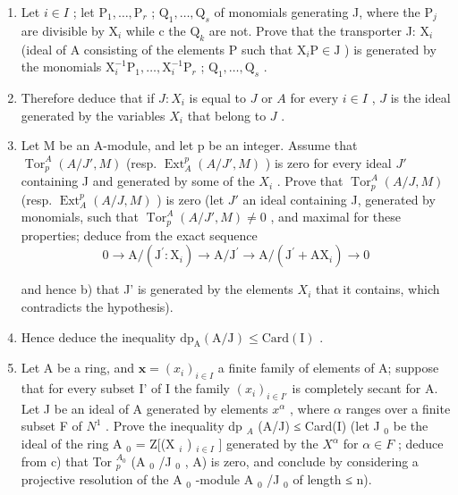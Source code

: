 \begin{enumerate}
\def\labelenumi{\alph{enumi})}
\item
  Let \(i \in I\) ; let \(\mathrm{P}_{1}, \ldots, \mathrm{P}_{r}\) ; \(\mathrm{Q}_{1}, \ldots, \mathrm{Q}_{s}\) of monomials generating J, where the \(\mathrm{P}_{j}\) are divisible by \(\mathrm{X}_{i}\) while c the \(\mathrm{Q}_{k}\) are not. Prove that the transporter J: \(\mathrm{X}_{i}\) (ideal of A consisting of the elements P such that \(\mathrm{X}_{i} \mathrm{P} \in \mathrm{J}\) ) is generated by the monomials \(\mathrm{X}_{i}^{-1} \mathrm{P}_{1}, \ldots, \mathrm{X}_{i}^{-1} \mathrm{P}_{r}\) ; \(\mathrm{Q}_{1}, \ldots, \mathrm{Q}_{s}\) .
\item
  Therefore deduce that if \(J: X_i\) is equal to \(J\) or \(A\) for every \(i \in I\) , \(J\) is the ideal generated by the variables \(X_i\) that belong to \(J\) .
\item
  Let M be an A-module, and let p be an integer. Assume that \(\operatorname{Tor}_{p}^{A}(A/J',M)\) (resp. \(\operatorname{Ext}_{A}^{p}(A/J',M)\) ) is zero for every ideal \(J'\) containing J and generated by some of the \(X_{i}\) . Prove that \(\operatorname{Tor}_{p}^{A}(A/J,M)\) (resp. \(\operatorname{Ext}_{A}^{p}(A/J,M)\) ) is zero (let \(J'\) an ideal containing J, generated by monomials, such that \(\operatorname{Tor}_{p}^{A}(A/J',M) \neq 0\) , and maximal for these properties; deduce from the exact sequence
\[
0 \rightarrow \mathrm{A} / (\mathrm{J} ^ {\prime}: \mathrm{X} _ {i}) \longrightarrow \mathrm{A} / \mathrm{J} ^ {\prime} \longrightarrow \mathrm{A} / (\mathrm{J} ^ {\prime} + \mathrm{AX} _ {i}) \rightarrow 0
\]

and hence b) that J' is generated by the elements \(X_{i}\) that it contains, which contradicts the hypothesis).

\item
  Hence deduce the inequality \(\mathrm{dp}_{\mathrm{A}}(\mathrm{A}/\mathrm{J}) \leqslant \mathrm{Card}(\mathrm{I})\) .

\item
  Let A be a ring, and \(\mathbf{x} = (x_{i})_{i \in I}\) a finite family of elements of A; suppose that for every subset I' of I the family \((x_{i})_{i \in I'}\) is completely secant for A. Let J be an ideal of A generated by elements \(x^{\alpha}\) , where \(\alpha\) ranges over a finite subset F of \(N^{1}\) . Prove the inequality dp \(_{A}\) (A/J) ≤ Card(I) (let J \(_{0}\) be the ideal of the ring A \(_{0}\) = Z{[}(X \(_{i}\) ) \(_{i \in I}\) {]} generated by the \(X^{\alpha}\) for \(\alpha \in F\) ; deduce from c) that Tor \(_{p}^{A_{0}}\) (A \(_{0}\) /J \(_{0}\) , A) is zero, and conclude by considering a projective resolution of the A \(_{0}\) -module A \(_{0}\) /J \(_{0}\) of length ≤ n).
\end{enumerate}

